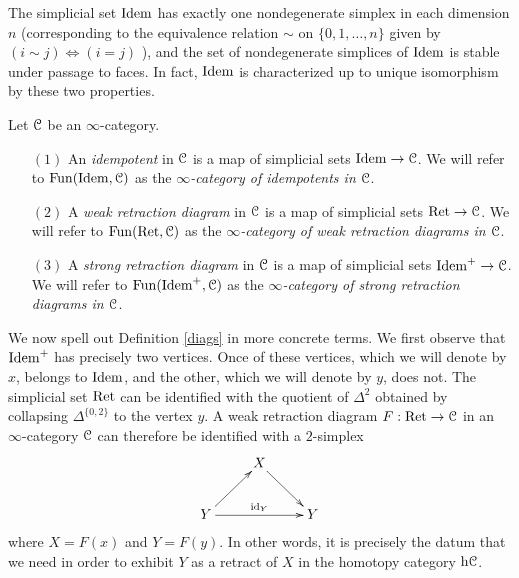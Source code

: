 \begin{remark}
The simplicial set $\operatorname{Idem}$ has exactly one nondegenerate simplex in each dimension $n$ (corresponding to the equivalence relation $\sim$ on $\{0, 1, \ldots, n\}$ given by
$( i \sim j) \Leftrightarrow (i = j)$ ), and the set of nondegenerate simplices of $\operatorname{Idem}$ is stable under passage to faces. In fact, $\operatorname{Idem}$ is characterized up to unique isomorphism by these two properties.
\end{remark}

\begin{definition}\label{diags}
Let $\operatorname{\mathcal{C}}$ be an $\infty$-category.
\begin{itemize}
\item[$(1)$] An {\it idempotent} in $\operatorname{\mathcal{C}}$ is a map of simplicial sets
$\operatorname{Idem} \rightarrow \operatorname{\mathcal{C}}$. We will refer to $\operatorname{Fun}(\operatorname{Idem},\operatorname{\mathcal{C}})$ as the {\it $\infty$-category of
idempotents in $\operatorname{\mathcal{C}}$}.

\item[$(2)$] A {\it weak retraction diagram} in $\operatorname{\mathcal{C}}$ is a map of simplicial sets
$\operatorname{Ret} \rightarrow \operatorname{\mathcal{C}}$. We will refer to $\operatorname{Fun}(\operatorname{Ret},\operatorname{\mathcal{C}})$ as the {\it $\infty$-category of weak retraction diagrams in $\operatorname{\mathcal{C}}$}.

\item[$(3)$] A {\it strong retraction diagram} in $\operatorname{\mathcal{C}}$ is a map of simplicial sets
$\operatorname{Idem}^{+} \rightarrow \operatorname{\mathcal{C}}$. We will refer to $\operatorname{Fun}(\operatorname{Idem}^{+},\operatorname{\mathcal{C}})$ as the {\it $\infty$-category of strong retraction diagrams in $\operatorname{\mathcal{C}}$}. 
\end{itemize}
\end{definition}

We now spell out Definition \ref{diags} in more concrete terms. We first observe that
$\operatorname{Idem}^{+}$ has precisely two vertices. Once of these vertices, which we will denote by $x$, belongs to $\operatorname{Idem}$, and the other, which we will denote by $y$, does not. The simplicial
set $\operatorname{Ret}$ can be identified with the quotient of $\Delta^{2}$ obtained by collapsing
$\Delta^{ \{0,2\} }$ to the vertex $y$. A weak retraction diagram $F: \operatorname{Ret} \rightarrow \operatorname{\mathcal{C}}$
in an $\infty$-category $\operatorname{\mathcal{C}}$ can therefore be identified with a $2$-simplex
$$ \xymatrix{ & X \ar[dr] & \\
Y \ar[ur] \ar[rr]^{\id_{Y}} & & Y }$$
where $X = F(x)$ and $Y = F(y)$. In other words, it is precisely the datum that we need in order to exhibit $Y$ as a retract of $X$ in the homotopy category $\rm{h} \it{\operatorname{\mathcal{C}}}$.

